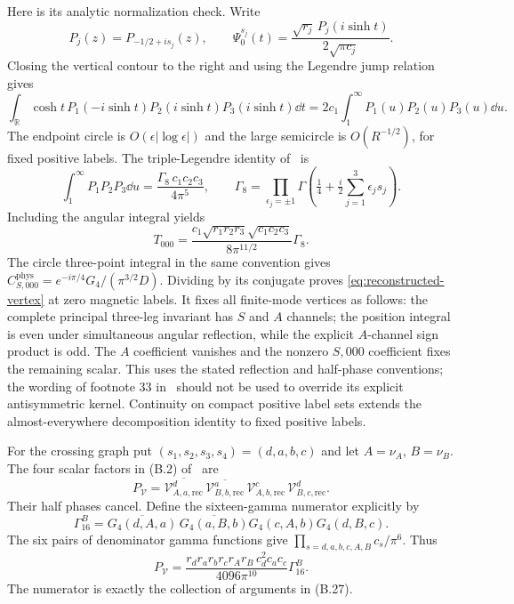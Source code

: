 Here is its analytic normalization check. Write
\[
 P_j(z)=P_{-1/2+is_j}(z),\qquad
 \Psi_0^{s_j}(t)=\frac{\sqrt{r_j}\,P_j(i\sinh t)}{2\sqrt{\pi c_j}}.
\]
Closing the vertical contour to the right and using the Legendre jump
relation gives
\begin{equation}
 \int_{\mathbb R}\cosh t\,P_1(-i\sinh t)P_2(i\sinh t)P_3(i\sinh t)\dd t
 =2c_1\int_1^\infty P_1(u)P_2(u)P_3(u)\dd u.
\end{equation}
The endpoint circle is $O(\epsilon|\log\epsilon|)$ and the large
semicircle is $O(R^{-1/2})$, for fixed positive labels. The triple-Legendre
identity of~\cite{Bros} is
\begin{equation}
 \int_1^\infty P_1P_2P_3\dd u
 =\frac{\Gamma_8\,c_1c_2c_3}{4\pi^5},\qquad
 \Gamma_8=\prod_{\epsilon_j=\pm1}
 \Gamma\!\left(\tfrac14+\tfrac i2\sum_{j=1}^3\epsilon_js_j\right).
\end{equation}
Including the angular integral yields
\begin{equation}
 T_{000}=\frac{c_1\sqrt{r_1r_2r_3}\sqrt{c_1c_2c_3}}
                     {8\pi^{11/2}}\Gamma_8.
\end{equation}
The circle three-point integral in the same convention gives
$C_{S,000}^{\mathrm{phys}}=e^{-i\pi/4}G_4/(\pi^{3/2}D)$.
Dividing by its conjugate proves \eqref{eq:reconstructed-vertex} at zero
magnetic labels. It fixes all finite-mode vertices as follows: the complete
principal three-leg invariant has $S$ and $A$ channels; the position integral
is even under simultaneous angular reflection, while the explicit
$A$-channel sign product is odd. The $A$ coefficient vanishes and the
nonzero $S,000$ coefficient fixes the remaining scalar. This uses the
stated reflection and half-phase conventions; the wording of footnote 33
in~\cite{KL} should not be used to override its explicit antisymmetric
kernel. Continuity on compact positive label sets extends the
almost-everywhere decomposition identity to fixed positive labels.

For the crossing graph put $(s_1,s_2,s_3,s_4)=(d,a,b,c)$ and let
$A=\nu_A$, $B=\nu_B$. The four scalar factors in (B.2) of~\cite{KL} are
\begin{equation}
 P_{\mathcal V}=
 \overline{\mathcal V^d_{A,a,\mathrm{rec}}}\,
 \overline{\mathcal V^a_{B,b,\mathrm{rec}}}\,
 \mathcal V^c_{A,b,\mathrm{rec}}\,
 \mathcal V^d_{B,c,\mathrm{rec}}.
\end{equation}
Their half phases cancel. Define the sixteen-gamma numerator explicitly by
\begin{equation}
 \Gamma_{16}^{B}
 =\overline{G_4(d,A,a)}\,\overline{G_4(a,B,b)}
                    G_4(c,A,b)G_4(d,B,c).
\end{equation}
The six pairs of denominator gamma functions give
$\prod_{s=d,a,b,c,A,B}c_s/\pi^6$. Thus
\begin{equation}
 P_{\mathcal V}
 =\frac{r_dr_ar_br_cr_Ar_B\,c_d^2c_ac_c}{4096\pi^{10}}
                         \Gamma_{16}^{B}.
 \label{eq:four-vertex-product}
\end{equation}
The numerator is exactly the collection of arguments in (B.27).

